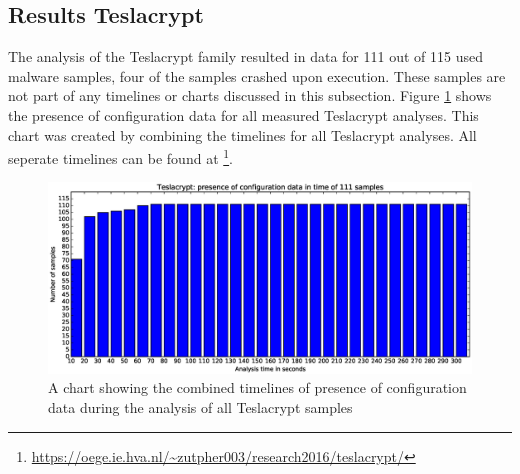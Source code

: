 \documentclass[conference]{IEEEtran}
\begin{document}
\subsection{Results Teslacrypt}
The analysis of the Teslacrypt family resulted in data for 111 out of 115 used malware samples, four of the samples crashed upon execution. These samples are not part of any timelines or charts discussed in this subsection. Figure \ref{fig:teslacrypt-bar} shows the presence of configuration data for all measured Teslacrypt analyses. This chart was created by combining the timelines for all Teslacrypt analyses. All seperate timelines can be found at \footnote{\url{https://oege.ie.hva.nl/~zutpher003/research2016/teslacrypt/}}.


\begin{figure}[h]
	\hspace{-3cm}
    \includegraphics[width=13cm,trim=-70mm 0mm 0mm 9mm, clip=true]{images/teslacrypt/teslacrypt-barchart.eps}
    \caption{A chart showing the combined timelines of presence of configuration data during the analysis of all Teslacrypt samples}
    \label{fig:teslacrypt-bar}
\end{figure}
\end{document}
